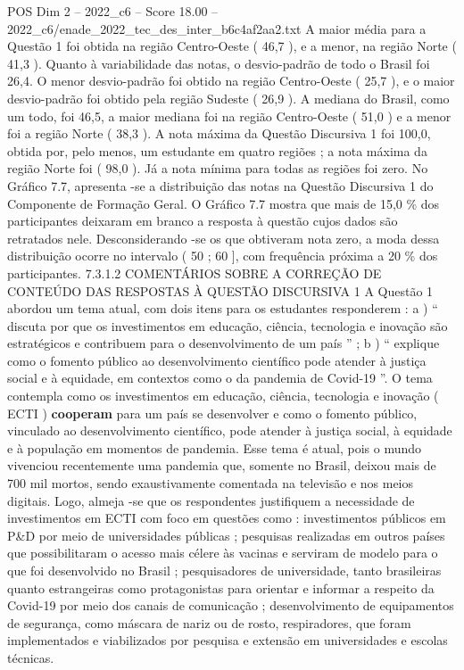 \begin{textsample}{POS Dim 2 – 2022\_c6 – Score 18.00 – 2022\_c6/enade\_2022\_tec\_des\_inter\_b6c4af2aa2.txt}
A maior média para a Questão 1 foi obtida na região Centro-Oeste ( 46,7 ), e a menor, na região Norte ( 41,3 ).
Quanto à variabilidade das notas, o desvio-padrão de todo o Brasil foi 26,4.
O menor desvio-padrão foi obtido na região Centro-Oeste ( 25,7 ), e o maior desvio-padrão foi obtido pela região Sudeste ( 26,9 ).
A mediana do Brasil, como um todo, foi 46,5, a maior mediana foi na região Centro-Oeste ( 51,0 ) e a menor foi a região Norte ( 38,3 ).
A nota máxima da Questão Discursiva 1 foi 100,0, obtida por, pelo menos, um estudante em quatro regiões ; a nota máxima da região Norte foi ( 98,0 ).
Já a nota mínima para todas as regiões foi zero.
No Gráfico 7.7, apresenta -se a distribuição das notas na Questão Discursiva 1 do Componente de Formação Geral.
O Gráfico 7.7 mostra que mais de 15,0 \% dos participantes deixaram em branco a resposta à questão cujos dados são retratados nele.
Desconsiderando -se os que obtiveram nota zero, a moda dessa distribuição ocorre no intervalo ( 50 ; 60 ], com frequência próxima a 20 \% dos participantes. 7.3.1.2 COMENTÁRIOS SOBRE A CORREÇÃO DE CONTEÚDO DAS RESPOSTAS À QUESTÃO DISCURSIVA 1 A Questão 1 abordou um tema atual, com dois itens para os estudantes responderem : a ) “ discuta por que os investimentos em educação, ciência, tecnologia e inovação são estratégicos e contribuem para o desenvolvimento de um país ” ; b ) “ explique como o fomento público ao desenvolvimento científico pode atender à justiça social e à equidade, em contextos como o da pandemia de Covid-19 ”.
O tema contempla como os investimentos em educação, ciência, tecnologia e inovação ( ECTI ) \textbf{cooperam} para um país se desenvolver e como o fomento público, vinculado ao desenvolvimento científico, pode atender à justiça social, à equidade e à população em momentos de pandemia.
Esse tema é atual, pois o mundo vivenciou recentemente uma pandemia que, somente no Brasil, deixou mais de 700 mil mortos, sendo exaustivamente comentada na televisão e nos meios digitais.
Logo, almeja -se que os respondentes justifiquem a necessidade de investimentos em ECTI com foco em questões como : investimentos públicos em P\&D por meio de universidades públicas ; pesquisas realizadas em outros países que possibilitaram o acesso mais célere às vacinas e serviram de modelo para o que foi desenvolvido no Brasil ; pesquisadores de universidade, tanto brasileiras quanto estrangeiras como protagonistas para orientar e informar a respeito da Covid-19 por meio dos canais de comunicação ; desenvolvimento de equipamentos de segurança, como máscara de nariz ou de rosto, respiradores, que foram implementados e viabilizados por pesquisa e extensão em universidades e escolas técnicas.

\end{textsample}
